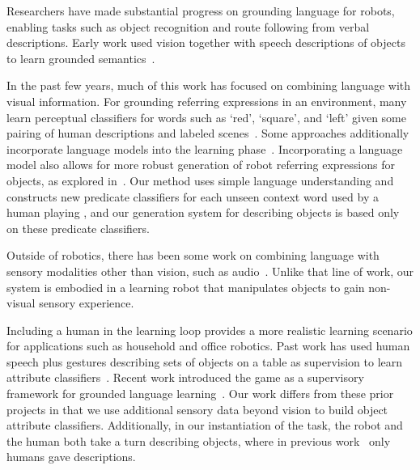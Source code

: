 Researchers have made substantial progress on grounding language for robots, enabling tasks such as object recognition and route following from verbal descriptions.
Early work used vision together with speech descriptions of objects to learn grounded semantics~\cite{roy:cogsci02}.

In the past few years, much of this work has focused on combining language with visual information.
For grounding referring expressions in an environment, many learn perceptual classifiers for words such as `red', `square', and `left' given some pairing of human descriptions and labeled scenes~\cite{liu:acl14,malinowski:nips14,mohan:acs13,sun:icra13,dindo:iros10,vogel:aaai10}.
Some approaches additionally incorporate language models into the learning phase~\cite{spranger:ijcai15,krishnamurthy:acl13,perera:aaai13,matuszek:icml12}.
Incorporating a language model also allows for more robust generation of robot referring expressions for objects, as explored in~\cite{tellex:rss14}. Our method uses simple language understanding and constructs new predicate classifiers for each unseen context word used by a human playing \ispy, and our generation system for describing objects is based only on these predicate classifiers.

Outside of robotics, there has been some work on combining language with sensory modalities other than vision, such as audio~\cite{kiela:emnlp15}.
Unlike that line of work, our system is embodied in a learning robot that manipulates objects to gain non-visual sensory experience.

Including a human in the learning loop provides a more realistic learning scenario for applications such as household and office robotics.
Past work has used human speech plus gestures describing sets of objects on a table as supervision to learn attribute classifiers~\cite{matuszek:aaai14,kollar:rss13}. Recent work introduced the \ispy game as a supervisory framework for grounded language learning~\cite{parde:ijcai15}.
Our work differs from these prior projects in that we use additional sensory data beyond vision to build object attribute classifiers. Additionally, in our instantiation of the \ispy task, the robot and the human both take a turn describing objects, where in previous work~\cite{parde:ijcai15} only humans gave descriptions.
